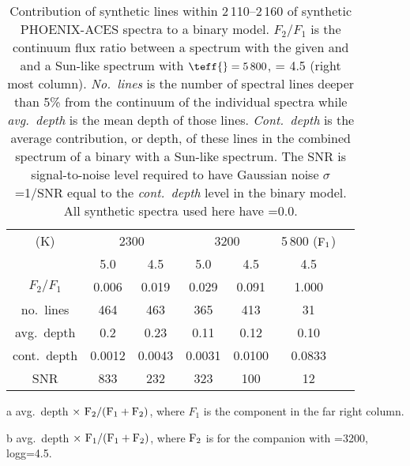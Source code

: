 
\begin{table}
    \small
    \centering
    \begin{threeparttable}[b]
        \caption{Contribution of synthetic lines within 2\,110--2\,160\nm{} of synthetic {PHOENIX-ACES} spectra to a binary model. \(F_{2}/F_{1}\) is the continuum flux ratio between a spectrum with the given \teff{} and \logg{} and a Sun-like spectrum with \(\teff{}=5\,800\),\logg{} = 4.5 (right most column). \emph{No.\ lines} is the number of spectral lines deeper than 5\% from the continuum of the individual spectra while \emph{avg.\ depth} is the mean depth of those lines. \emph{Cont.\ depth} is the average contribution, or depth, of these lines in the combined spectrum of a binary with a Sun-like spectrum. The {SNR} is signal-to-noise level required to have Gaussian noise \(\sigma\) =1/{SNR} equal to the \emph{cont.\ depth} level in the binary model. All synthetic spectra used here have \feh{}=0.0.}
        \begin{tabular}{*7c}
            \toprule
            \teff{} (K)  & \multicolumn{2}{c}{2300} & \multicolumn{2}{c}{3200} & 5\,800 (\(\rm F_1\))\\
           \logg{} & 5.0 & 4.5  & 5.0 & 4.5 & 4.5 \\
            \midrule
            \(F_2/F_1\) & 0.006 & 0.019 & 0.029  & 0.091 & 1.000 \\
            no.\ lines & 464 & 463 & 365  & 413 & 31 \\
            avg.\ depth & 0.2  & 0.23& 0.11 & 0.12 & 0.10 \\
            cont.\ depth\tnote{a} &  0.0012 & 0.0043 &  0.0031 & 0.0100&  0.0833\tnote{b} \\
            {SNR}  & 833 & 232 & 323  & 100 & 12 \\
            \bottomrule
        \end{tabular}\label{tab:line_contributions}
        \begin{tablenotes}
            \item [a] avg.\ depth \(\times~ \rm F_2 / (F_1 + F_2)\), where \(F_1\) is the component in the far right column.
            \item[b] avg.\ depth \(\times~ \rm F_1 / (F_1 + F_2)\), where \(\rm F_2\) is for the  companion with \teff{}=3200, logg=4.5.
        \end{tablenotes}
    \end{threeparttable}
\end{table}
